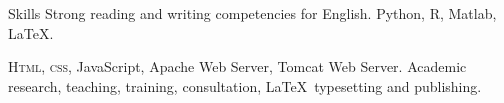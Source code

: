 
\begin{rubric}{Skills}
\entry*[Languages]
	Strong reading and writing competencies for English.
	Python, R, Matlab, \LaTeX.

	\textsc{Html, css}, JavaScript, Apache Web Server, Tomcat Web Server.
\entry*[Misc.]
	Academic research, teaching, training, consultation, \LaTeX\ typesetting and publishing.
\end{rubric}
